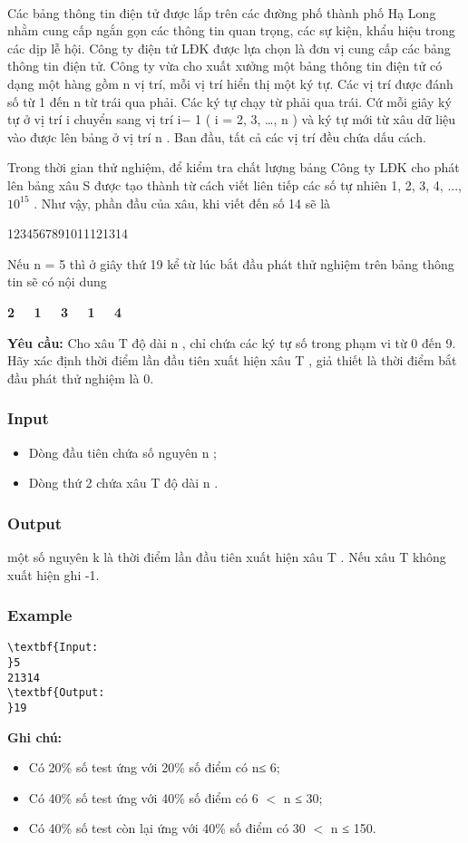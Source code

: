 

 

Các bảng thông tin điện tử được lắp trên các đường phố thành phố Hạ Long nhằm cung cấp ngắn gọn các thông tin quan trọng, các sự kiện, khẩu hiệu trong các dịp lễ hội. Công ty điện tử LĐK được lựa chọn là đơn vị cung cấp các bảng thông tin điện tử. Công ty vừa cho xuất xưởng một bảng thông tin điện tử có dạng một hàng gồm n vị trí, mỗi vị trí hiển thị một ký tự. Các vị trí được đánh số từ 1 đến n từ trái qua phải. Các ký tự chạy từ phải qua trái. Cứ mỗi giây ký tự ở vị trí i chuyển sang vị trí i− 1 ( i = 2, 3, …, n ) và ký tự mới từ xâu dữ liệu vào được lên bảng ở vị trí n . Ban đầu, tất cả các vị trí đều chứa dấu cách.

Trong thời gian thử nghiệm, để kiểm tra chất lượng bảng Công ty LĐK cho phát lên bảng xâu S được tạo thành từ cách viết liên tiếp các số tự nhiên 1, 2, 3, 4, ..., $10^{15}$ . Như vậy, phần đầu của xâu, khi viết đến số 14 sẽ là

1234567891011121314

Nếu n = 5 thì ở giây thứ 19 kể từ lúc bắt đầu phát thử nghiệm trên bảng thông tin sẽ có nội dung

\textbf{2   1   3   1   4 }

\textbf{Yêu cầu: } Cho xâu T độ dài n , chỉ chứa các ký tự số trong phạm vi từ 0 đến 9. Hãy xác định thời điểm lần đầu tiên xuất hiện xâu T , giả thiết là thời điểm bắt đầu phát thử nghiệm là 0.

\subsubsection{Input}
\begin{itemize}
	\item Dòng đầu tiên chứa số nguyên n ;
	\item Dòng thứ 2 chứa xâu T độ dài n .
\end{itemize}

\subsubsection{Output}

một số nguyên k là thời điểm lần đầu tiên xuất hiện xâu T . Nếu xâu T không xuất hiện ghi -1.

\subsubsection{Example}
\begin{verbatim}
\textbf{Input:
}5
21314
\textbf{Output:
}19 
\end{verbatim}

\textbf{\textbf{Ghi chú:}}
\begin{itemize}
	\item Có 20\% số test ứng với 20\% số điểm có n≤ 6;
	\item Có 40\% số test ứng với 40\% số điểm có 6 $<$ n ≤ 30;
	\item Có 40\% số test còn lại ứng với 40\% số điểm có 30 $<$ n ≤ 150.
\end{itemize}
